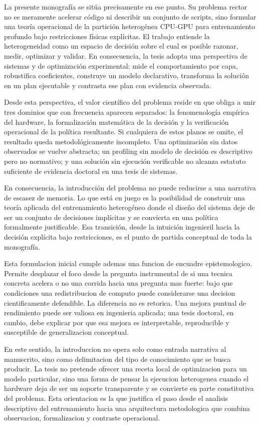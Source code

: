 La presente monografía se sitúa precisamente en ese punto. Su problema rector no es meramente acelerar código ni describir un conjunto de scripts, sino formular una teoría operacional de la partición heterogénea CPU-GPU para entrenamiento profundo bajo restricciones físicas explícitas. El trabajo entiende la heterogeneidad como un espacio de decisión sobre el cual es posible razonar, medir, optimizar y validar. En consecuencia, la tesis adopta una perspectiva de sistemas y de optimización experimental: mide el comportamiento por capa, robustifica coeficientes, construye un modelo declarativo, transforma la solución en un plan ejecutable y contrasta ese plan con evidencia observada.

Desde esta perspectiva, el valor científico del problema reside en que obliga a unir tres dominios que con frecuencia aparecen separados: la fenomenología empírica del hardware, la formalización matemática de la decisión y la verificación operacional de la política resultante. Si cualquiera de estos planos se omite, el resultado queda metodológicamente incompleto. Una optimización sin datos observados se vuelve abstracta; un profiling sin modelo de decisión es descriptivo pero no normativo; y una solución sin ejecución verificable no alcanza estatuto suficiente de evidencia doctoral en una tesis de sistemas.

En consecuencia, la introducción del problema no puede reducirse a una narrativa de escasez de memoria. Lo que está en juego es la posibilidad de construir una teoría aplicada del entrenamiento heterogéneo donde el diseño del sistema deje de ser un conjunto de decisiones implícitas y se convierta en una política formalmente justificable. Esa transición, desde la intuición ingenieril hacia la decisión explícita bajo restricciones, es el punto de partida conceptual de toda la monografía.

Esta formulacion inicial cumple ademas una funcion de encuadre epistemologico. Permite desplazar el foco desde la pregunta instrumental de si una tecnica concreta acelera o no una corrida hacia una pregunta mas fuerte: bajo que condiciones una redistribucion de computo puede considerarse una decision cientificamente defendible. La diferencia no es retorica. Una mejora puntual de rendimiento puede ser valiosa en ingenieria aplicada; una tesis doctoral, en cambio, debe explicar por que esa mejora es interpretable, reproducible y susceptible de generalizacion conceptual.

En este sentido, la introduccion no opera solo como entrada narrativa al manuscrito, sino como delimitacion del tipo de conocimiento que se busca producir. La tesis no pretende ofrecer una receta local de optimizacion para un modelo particular, sino una forma de pensar la ejecucion heterogenea cuando el hardware deja de ser un soporte transparente y se convierte en parte constitutiva del problema. Esta orientacion es la que justifica el paso desde el analisis descriptivo del entrenamiento hacia una arquitectura metodologica que combina observacion, formalizacion y contraste operacional.

